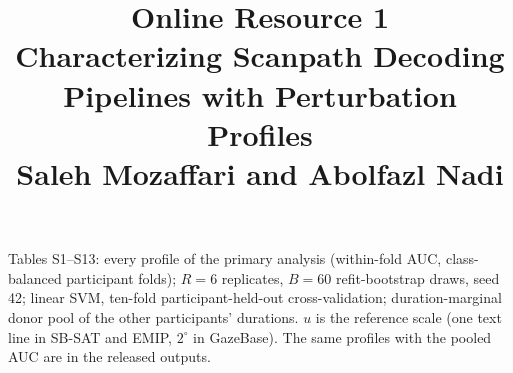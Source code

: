 \documentclass[10pt]{article}
\title{Online Resource 1\\[0.5ex]\large Characterizing Scanpath Decoding Pipelines with Perturbation Profiles\\[0.5ex]\normalsize Saleh Mozaffari and Abolfazl Nadi}
\author{}
\date{}
\begin{document}
\maketitle
\noindent Tables S1--S13: every profile of the primary analysis (within-fold AUC, class-balanced participant folds); $R = 6$ replicates, $B = 60$ refit-bootstrap draws, seed 42; linear SVM, ten-fold participant-held-out cross-validation; duration-marginal donor pool of the other participants' durations. $u$ is the reference scale (one text line in SB-SAT and EMIP, $2^\circ$ in GazeBase). The same profiles with the pooled AUC are in the released outputs.


\begin{table}[!htbp]\centering\scriptsize
\caption{Observed pooled AUC (all out-of-fold decision values ranked together; class-balanced participant folds), with the permutation $p$-value in brackets (200 permutations under the schemes of Table 2 of the article).}
\resizebox{\linewidth}{!}{}
\end{table}

\begin{table}[!htbp]\centering\scriptsize
\caption{Range, over descriptors, of the mean of the permutation distribution of the observed AUC, under the within-fold AUC (1000 permutations) and the pooled AUC (200 permutations), both with class-balanced folds. On \texttt{em\_correct} labels are permuted within programs and on \texttt{sb\_compr} between the passages of a participant, so stimulus structure that survives the permutation raises the mean for descriptors that read it.}

\end{table}

{\scriptsize\setlength{\tabcolsep}{2.5pt}\setlength{\LTcapwidth}{\linewidth}

}

\begin{table}[!htbp]\centering\scriptsize
\caption{Bootstrap standard error against the empirical spread of the estimate in the calibration campaign ($R = 6$, $B = 60$; 40 datasets per design and size). SE ratio: mean bootstrap SE divided by the SD of the estimate across datasets, per contrast; median and range over the contrasts of the cell. Coverage of the target by normal intervals at nominal 80\%, 90\% and 95\%.}

\end{table}

\begin{table}[!htbp]\centering\scriptsize
\caption{Corrected refit bootstrap (Equation 1) against the direct refit bootstrap, which averages all $R = 6$ transformed replicates inside each of the $B = 60$ draws, on the same 200 datasets per cell. Coverage of the target, mean width, and the share of intervals excluding zero.}

\end{table}
\end{document}
